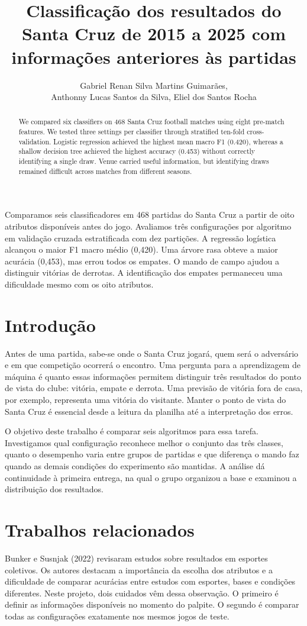 \documentclass[12pt]{article}
\title{Classificação dos resultados do Santa Cruz de 2015 a 2025 com informações anteriores às partidas}
\author{Gabriel Renan Silva Martins Guimarães,\\ Anthonny Lucas Santos da Silva, Eliel dos Santos Rocha}
\begin{document}
\maketitle
\begin{abstract}
We compared six classifiers on 468 Santa Cruz football matches using eight pre-match features. We tested three settings per classifier through stratified ten-fold cross-validation. Logistic regression achieved the highest mean macro F1 (0.420), whereas a shallow decision tree achieved the highest accuracy (0.453) without correctly identifying a single draw. Venue carried useful information, but identifying draws remained difficult across matches from different seasons.
\end{abstract}
\begin{resumo}
Comparamos seis classificadores em 468 partidas do Santa Cruz a partir de oito atributos disponíveis antes do jogo. Avaliamos três configurações por algoritmo em validação cruzada estratificada com dez partições. A regressão logística alcançou o maior F1 macro médio (0,420). Uma árvore rasa obteve a maior acurácia (0,453), mas errou todos os empates. O mando de campo ajudou a distinguir vitórias de derrotas. A identificação dos empates permaneceu uma dificuldade mesmo com os oito atributos.
\end{resumo}
\section{Introdução}
Antes de uma partida, sabe-se onde o Santa Cruz jogará, quem será o adversário e em que competição ocorrerá o encontro. Uma pergunta para a aprendizagem de máquina é quanto essas informações permitem distinguir três resultados do ponto de vista do clube: vitória, empate e derrota. Uma previsão de vitória fora de casa, por exemplo, representa uma vitória do visitante. Manter o ponto de vista do Santa Cruz é essencial desde a leitura da planilha até a interpretação dos erros.

O objetivo deste trabalho é comparar seis algoritmos para essa tarefa. Investigamos qual configuração reconhece melhor o conjunto das três classes, quanto o desempenho varia entre grupos de partidas e que diferença o mando faz quando as demais condições do experimento são mantidas. A análise dá continuidade à primeira entrega, na qual o grupo organizou a base e examinou a distribuição dos resultados.
\clearpage
\section{Trabalhos relacionados}
Bunker e Susnjak (2022) revisaram estudos sobre resultados em esportes coletivos. Os autores destacam a importância da escolha dos atributos e a dificuldade de comparar acurácias entre estudos com esportes, bases e condições diferentes. Neste projeto, dois cuidados vêm dessa observação. O primeiro é definir as informações disponíveis no momento do palpite. O segundo é comparar todas as configurações exatamente nos mesmos jogos de teste.
\end{document}
